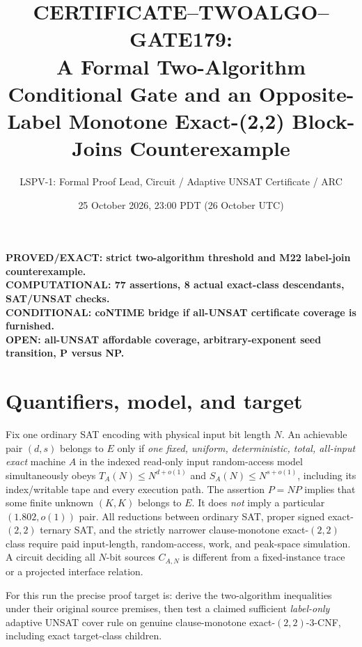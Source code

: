 \documentclass[11pt]{article}
\title{CERTIFICATE--TWOALGO--GATE179:\\
\large A Formal Two-Algorithm Conditional Gate and an Opposite-Label\newline
Monotone Exact-(2,2) Block-Joins Counterexample}
\author{LSPV-1: Formal Proof Lead, Circuit / Adaptive UNSAT Certificate / ARC}
\date{25 October 2026, 23:00 PDT (26 October UTC)}
\begin{document}
\maketitle
\begin{center}
\textbf{PROVED/EXACT: strict two-algorithm threshold and M22 label-join counterexample.}\\
\textbf{COMPUTATIONAL: 77 assertions, 8 actual exact-class descendants, SAT/UNSAT checks.}\\
\textbf{CONDITIONAL: coNTIME bridge if all-UNSAT certificate coverage is furnished.}\\
\textbf{OPEN: all-UNSAT affordable coverage, arbitrary-exponent seed transition, P versus NP.}
\end{center}

\section{Quantifiers, model, and target}
Fix one ordinary SAT encoding with physical input bit length $N$.
An achievable pair $(d,s)$ belongs to $E$ only if \emph{one fixed, uniform,
deterministic, total, all-input exact} machine $A$ in the indexed read-only
input random-access model simultaneously obeys
$T_A(N)\le N^{d+o(1)}$ and $S_A(N)\le N^{s+o(1)}$, including its
index/writable tape and every execution path. The assertion $P=NP$
implies that some finite unknown $(K,K)$ belongs to $E$. It does \emph{not}
imply a particular $(1.802,o(1))$ pair. All reductions between ordinary
SAT, proper signed exact-$(2,2)$ ternary SAT, and the strictly narrower
clause-monotone exact-$(2,2)$ class require paid input-length, random-access,
work, and peak-space simulation. A circuit deciding all $N$-bit sources
$C_{A,N}$ is different from a fixed-instance trace or a projected
interface relation.

For this run the precise proof target is: derive the two-algorithm
inequalities under their original source premises, then test a claimed
sufficient \emph{label-only} adaptive UNSAT cover rule on genuine
clause-monotone exact-$(2,2)$-3-CNF, including exact target-class children.
\end{document}
